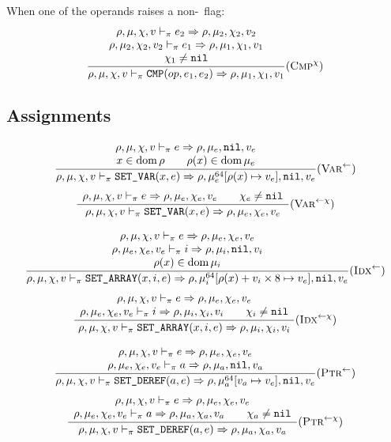When one of the operands raises a non-\nil\ flag:
\[\dfrac{\begin{array}{c}
    \rho,\mu,\chi,v \vdash_\pi e_2\Rightarrow \rho,\mu_2,\chi_2,v_2 \\
    \rho,\mu_2,\chi_2,v_2 \vdash_\pi e_1\Rightarrow \rho,\mu_1,\chi_1,v_1 \\
    \chi_1\ne\texttt{nil}
\end{array}}{\rho,\mu,\chi,v \vdash_\pi \texttt{CMP}(op, e_1, e_2) \Rightarrow \rho,\mu_1,\chi_1,v_1} (\textsc{Cmp}^\chi)\]

\subsection{Assignments}

\[\dfrac{\begin{array}{c}
    \rho,\mu,\chi,v \vdash_\pi e\Rightarrow \rho,\mu_e,\texttt{nil},v_e \\
    x\in\operatorname{dom}\rho \qquad \rho(x)\in\operatorname{dom}\mu_e
\end{array}}{\rho,\mu,\chi,v \vdash_\pi \texttt{SET\_VAR}(x, e) \Rightarrow \rho,\mu_e^{64}[\rho(x)\mapsto v_e],\texttt{nil},v_e}(\textsc{Var}^\gets)\]
\[\dfrac{\begin{array}{c}
    \rho,\mu,\chi,v \vdash_\pi e\Rightarrow \rho,\mu_e,\chi_e,v_e \qquad \chi_e\ne\texttt{nil}
\end{array}}{\rho,\mu,\chi,v \vdash_\pi \texttt{SET\_VAR}(x, e) \Rightarrow \rho,\mu_e,\chi_e,v_e}(\textsc{Var}^{\gets\chi})\]

\[\dfrac{\begin{array}{c}
    \rho,\mu,\chi,v \vdash_\pi e\Rightarrow \rho,\mu_e,\chi_e,v_e \\
    \rho,\mu_e,\chi_e,v_e \vdash_\pi i\Rightarrow \rho,\mu_i,\texttt{nil},v_i \\
    \rho(x)\in\operatorname{dom}\mu_i
\end{array}}{\rho,\mu,\chi,v \vdash_\pi \texttt{SET\_ARRAY}(x, i, e) \Rightarrow \rho,\mu_i^{64}[\rho(x)+v_i\times 8 \mapsto v_e],\texttt{nil},v_e}(\textsc{Idx}^\gets)\]
\[\dfrac{\begin{array}{c}
    \rho,\mu,\chi,v \vdash_\pi e\Rightarrow \rho,\mu_e,\chi_e,v_e \\
    \rho,\mu_e,\chi_e,v_e \vdash_\pi i\Rightarrow \rho,\mu_i,\chi_i,v_i \qquad \chi_i\ne\texttt{nil}
\end{array}}{\rho,\mu,\chi,v \vdash_\pi \texttt{SET\_ARRAY}(x, i, e) \Rightarrow \rho,\mu_i,\chi_i,v_i}(\textsc{Idx}^{\gets\chi})\]

\[\dfrac{\begin{array}{c}
    \rho,\mu,\chi,v \vdash_\pi e \Rightarrow \rho,\mu_e,\chi_e,v_e \\
    \rho,\mu_e,\chi_e,v_e \vdash_\pi a \Rightarrow \rho,\mu_a,\texttt{nil},v_a
\end{array}}{\rho,\mu,\chi,v \vdash_\pi \texttt{SET\_DEREF}(a, e) \Rightarrow \rho,\mu_a^{64}[v_a\mapsto v_e],\texttt{nil},v_e}(\textsc{Ptr}^\gets)\]
\[\dfrac{\begin{array}{c}
    \rho,\mu,\chi,v \vdash_\pi e \Rightarrow \rho,\mu_e,\chi_e,v_e \\
    \rho,\mu_e,\chi_e,v_e \vdash_\pi a \Rightarrow \rho,\mu_a,\chi_a,v_a \qquad \chi_a\ne\texttt{nil}
\end{array}}{\rho,\mu,\chi,v \vdash_\pi \texttt{SET\_DEREF}(a, e) \Rightarrow \rho,\mu_a,\chi_a,v_a}(\textsc{Ptr}^{\gets\chi})\]

